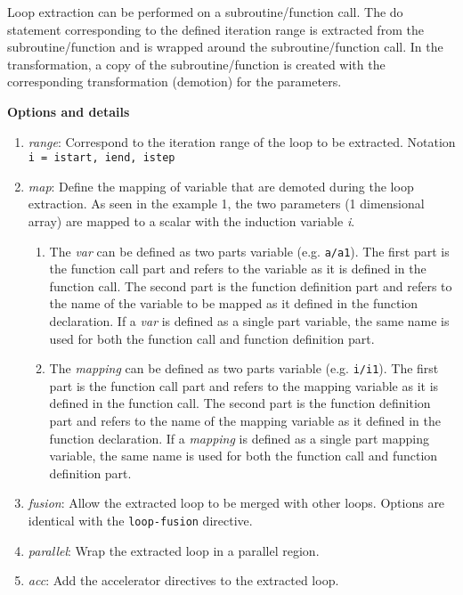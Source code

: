 \documentclass{article}
\begin{document}
Loop extraction can be performed on a subroutine/function call. The do statement corresponding
to the defined iteration range is extracted from the subroutine/function and is wrapped
around the subroutine/function call. In the transformation, a copy of the subroutine/function
is created with the corresponding transformation (demotion) for the parameters.


\textbf{Options and details}
\begin{enumerate}
\item \textit{range}: Correspond to the iteration range of the loop to be extracted.
  Notation \lstinline!i = istart, iend, istep!
\item \textit{map}: Define the mapping of variable that are demoted during the loop
  extraction. As seen in the example 1, the two parameters (1 dimensional array)
  are mapped to a scalar with the induction variable \textit{i}.
  \begin{enumerate}
    \item The \textit{var} can be defined as two parts variable (e.g. \lstinline!a/a1!). The
    first part is the function call part and refers to the variable as it is
    defined in the function call. The second part is the function definition
    part and refers to the name of the variable to be mapped as it defined in
    the function declaration. If a \textit{var} is defined as a single part variable,
    the same name is used for both the function call and function definition
    part.
    \item The \textit{mapping} can be defined as two parts variable (e.g. \lstinline!i/i1!). The
    first part is the function call part and refers to the mapping variable as
    it is defined in the function call. The second part is the function
    definition part and refers to the name of the mapping variable as it defined
    in the function declaration. If a \textit{mapping} is defined as a single part
    mapping variable, the same name is used for both the function call and
    function definition part.
    \end{enumerate}
\item \textit{fusion}: Allow the extracted loop to be merged with other loops.
Options are identical with the \lstinline!loop-fusion! directive.
\item \textit{parallel}: Wrap the extracted loop in a parallel region.
\item \textit{acc}: Add the accelerator directives to the extracted loop.
\end{enumerate}
\end{document}
